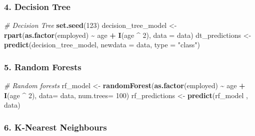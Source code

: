 \documentclass[
]{article}
\newenvironment{Shaded}{\begin{snugshade}}{\end{snugshade}}
\newcommand{\AttributeTok}[1]{\textcolor[rgb]{0.13,0.29,0.53}{#1}}
\newcommand{\CommentTok}[1]{\textcolor[rgb]{0.56,0.35,0.01}{\textit{#1}}}
\newcommand{\DecValTok}[1]{\textcolor[rgb]{0.00,0.00,0.81}{#1}}
\newcommand{\FunctionTok}[1]{\textcolor[rgb]{0.13,0.29,0.53}{\textbf{#1}}}
\newcommand{\NormalTok}[1]{#1}
\newcommand{\OtherTok}[1]{\textcolor[rgb]{0.56,0.35,0.01}{#1}}
\newcommand{\SpecialCharTok}[1]{\textcolor[rgb]{0.81,0.36,0.00}{\textbf{#1}}}
\newcommand{\StringTok}[1]{\textcolor[rgb]{0.31,0.60,0.02}{#1}}
\begin{document}
\hypertarget{decision-tree}{%
\subsubsection{4. Decision Tree}\label{decision-tree}}

\begin{Shaded}
\begin{Highlighting}[]
\CommentTok{\# Decision Tree}
\FunctionTok{set.seed}\NormalTok{(}\DecValTok{123}\NormalTok{)}
\NormalTok{decision\_tree\_model }\OtherTok{\textless{}{-}} \FunctionTok{rpart}\NormalTok{(}\FunctionTok{as.factor}\NormalTok{(employed) }\SpecialCharTok{\textasciitilde{}}\NormalTok{ age }\SpecialCharTok{+}  \FunctionTok{I}\NormalTok{(age }\SpecialCharTok{\^{}} \DecValTok{2}\NormalTok{), }\AttributeTok{data =}\NormalTok{ data)}
\NormalTok{dt\_predictions }\OtherTok{\textless{}{-}} \FunctionTok{predict}\NormalTok{(decision\_tree\_model, }\AttributeTok{newdata =}\NormalTok{ data, }\AttributeTok{type =} \StringTok{"class"}\NormalTok{)}
\end{Highlighting}
\end{Shaded}

\hypertarget{random-forests}{%
\subsubsection{5. Random Forests}\label{random-forests}}

\begin{Shaded}
\begin{Highlighting}[]
\CommentTok{\# Random forests}
\NormalTok{rf\_model }\OtherTok{\textless{}{-}} \FunctionTok{randomForest}\NormalTok{(}\FunctionTok{as.factor}\NormalTok{(employed) }\SpecialCharTok{\textasciitilde{}}\NormalTok{ age }\SpecialCharTok{+}  \FunctionTok{I}\NormalTok{(age }\SpecialCharTok{\^{}} \DecValTok{2}\NormalTok{),}
                         \AttributeTok{data=}\NormalTok{ data, }
                         \AttributeTok{num.trees=} \DecValTok{100}\NormalTok{) }
\NormalTok{rf\_predictions }\OtherTok{\textless{}{-}} \FunctionTok{predict}\NormalTok{(rf\_model , data)}
\end{Highlighting}
\end{Shaded}

\hypertarget{k-nearest-neighbours}{%
\subsubsection{6. K-Nearest Neighbours}\label{k-nearest-neighbours}}
\end{document}
